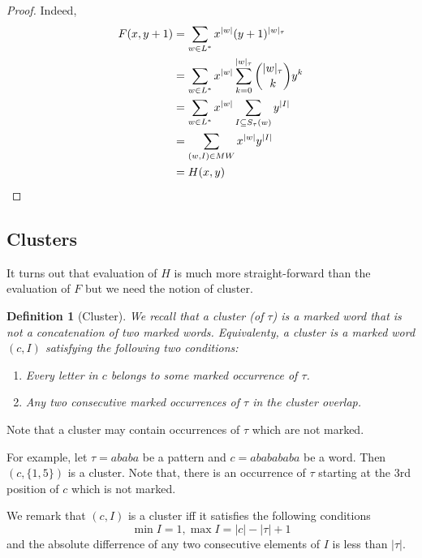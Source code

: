 \documentclass[12pt]{report}
\newtheorem{defn}[mythm]{Definition}
\begin{document}
{{\begin{proof} Indeed,
\begin{align*}
F(x,y+1) 
& = \sum\limits_{w \in L^*} x^{|w|} (y + 1)^{|w|_\tau} \\
& = \sum\limits_{w \in L^*} x^{|w|} \sum\limits_{k=0}^{|w|_\tau} \binom{|w|_\tau}{k} y^k \\
& = \sum\limits_{w \in L^*} x^{|w|} \sum\limits_{I \subseteq S_\tau(w)} y^{|I|}\\
& = \sum\limits_{(w, I) \in MW} x^{|w|} y^{|I|} \\
& = H(x,y)  \qedhere
\end{align*}
\end{proof}


\subsection{Clusters}

It turns out that evaluation of $H$ is much more straight-forward than the evaluation of $F$ but we need the notion of cluster.

\begin{defn}[Cluster]
 We recall that a {\em cluster} (of $\tau$) is a marked word that is not a concatenation of two marked words. Equivalenty, a cluster is a marked word $(c, I)$ satisfying the following two conditions:

\begin{enumerate}[label=\roman{*})]

\item Every letter in $c$ belongs to some marked occurrence of $\tau$.

\item Any two consecutive marked occurrences of $\tau$ in the cluster overlap.

\end{enumerate}
\end{defn}


\noindent Note that a cluster may contain occurrences of $\tau$ which are not marked.

For example, let $\tau=ababa$ be a pattern and $c = ababababa$ be a word. Then $(c,\{1,5\})$ is a cluster.
Note that, there is an occurrence of $\tau$ starting at the 3rd position of $c$ which is not marked.

We remark that $(c, I)$ is a cluster iff it satisfies the following conditions
\[ \min I = 1, \max I = |c| - |\tau| + 1\]
and the absolute differrence of any two consecutive elements of $I$ is less than $|\tau|$.

}}
\end{document}
